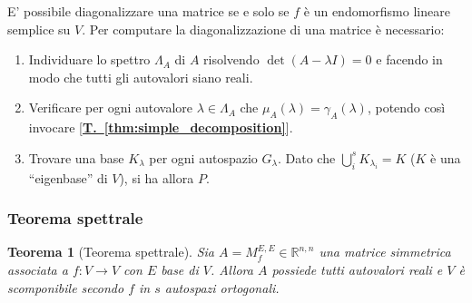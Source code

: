 \documentclass{article}
\newtheorem{theorem}{Teorema}
\begin{document}
    \vspace{10pt}
    E' possibile diagonalizzare una matrice se e solo se $f$ è un endomorfismo lineare semplice su $V$.
    Per computare la diagonalizzazione di una matrice è necessario:
    \begin{enumerate}[label=(\arabic*)]
        \item Individuare lo spettro $\Lambda_{A}$ di $A$ risolvendo $\det(A - \lambda I) = 0$ e facendo in modo che tutti gli autovalori siano reali.
        \item Verificare per ogni autovalore $\lambda \in \Lambda_{A}$ che $\mu_{A}(\lambda) = \gamma_{A}(\lambda)$, potendo così invocare [{\bfseries \hyperref[thm:simple_decomposition]{T.~\ref{thm:simple_decomposition}}}]. 
        \item Trovare una base $K_{\lambda}$ per ogni autospazio $G_{\lambda}$. Dato che $\displaystyle \bigcup_{i}^{s} K_{\lambda_i} = K$ ($K$ è una ``eigenbase'' di $V$), si ha allora $P$.
    \end{enumerate}
    
    \vspace{10pt}
    \subsubsection{Teorema spettrale} \label{subsubsec:linappspectralthm}
    \begin{theorem}[Teorema spettrale]
        Sia $A = M_{f}^{E, E} \in \mathbb{R}^{n, n}$ una matrice simmetrica associata a $f: V \rightarrow V$ con $E$ base di $V$. Allora $A$ possiede tutti autovalori reali e $V$ è scomponibile secondo $f$ in $s$ autospazi ortogonali.
    \end{theorem} 
\end{document}

